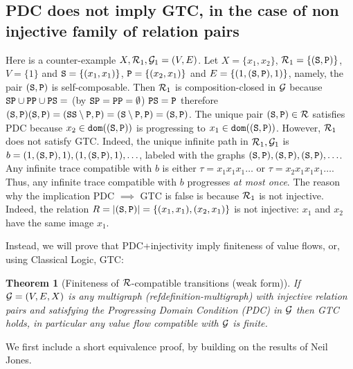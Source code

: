 \documentclass{lmcs}
\newtheorem{theorem}{Theorem}[section]
\begin{document}
\subsection{PDC does not imply GTC, in the case of non injective family of relation pairs}
\label{subsubsection-counterexample-PDC-GTC}
Here is a counter-example $X, {\mathcal R}_1, {\mathcal G}_1=(V,E)$.
Let $X = \{x_1,x_2\}$, ${\mathcal R}_1=\{({\tt S},{\tt P})\}$, $V=\{1\}$
and ${\tt S} =\{(x_1,x_1)\}$, ${\tt P} =\{(x_2,x_1)\}$ and
$E = \{(1, ({\tt S},{\tt P}), 1)\}$, 
namely, the pair $({\tt S},{\tt P})$ is self-composable. 
Then ${\mathcal R}_1$ is composition-closed in ${\mathcal G}$ because 
$
{\tt S}{\tt P} \cup {\tt P}{\tt P} \cup {\tt P}{\tt S} =
$ (by ${\tt S}{\tt P} = {\tt P}{\tt P} = \emptyset$) $
{\tt P}{\tt S} = 
{\tt P}
$
therefore
$
({\tt S},{\tt P})({\tt S},{\tt P}) = 
({\tt S}{\tt S} \setminus {\tt P}, {\tt P}) = 
({\tt S} \setminus {\tt P},{\tt P}) = 
({\tt S},{\tt P})
$.
The unique pair $({\tt S},{\tt P}) \in {\mathcal R}$ satisfies PDC 
because $x_2 \in {\tt dom}(({\tt S},{\tt P}))$
is progressing to  $x_1 \in {\tt dom}(({\tt S},{\tt P}))$. However, ${\mathcal R}_1$
does not satisfy GTC. Indeed, the unique infinite path in ${\mathcal R}_1,{\mathcal G}_1$ is 
$b = (1, ({\tt S},{\tt P}), 1), (1, ({\tt S},{\tt P}), 1), \ldots$, 
labeled with the graphs $({\tt S},{\tt P}),({\tt S},{\tt P}),({\tt S},{\tt P}),\ldots$.
Any infinite trace compatible with $b$ is either
$\tau = x_1 x_1 x_1 \ldots$ or $\tau = x_2 x_1 x_1 x_1 \ldots$. Thus, any infinite
trace compatible with $b$ progresses \emph{at most once}. 
The reason why the implication PDC $\implies$ GTC is false is because 
${\mathcal R}_1$ is not injective. Indeed, the relation 
$R = {| ({\tt S},{\tt P}) |} = \{(x_1,x_1), (x_2,x_1)\}$ is not injective:
$x_1$ and $x_2$ have the same image $x_1$.


Instead, we will prove that PDC+injectivity imply finiteness of value flows,
or, using Classical Logic, GTC:

\begin{theorem}[Finiteness of ${\mathcal R}$-compatible transitions (weak form)]
\label{theorem-finiteness-value-flow-1}
If ${\mathcal G}=(V,E,X)$ is any multigraph (ref{definition-multigraph})
with \emph{injective} relation pairs 
and satisfying the Progressing Domain Condition (PDC)  in ${\mathcal G}$
then GTC holds, in particular any value flow compatible with ${\mathcal G}$ is finite.
\end{theorem}


We first include a short equivalence proof, by building on the results of Neil Jones.
\end{document}
